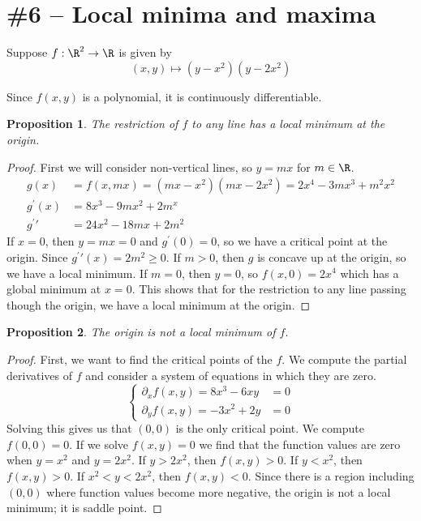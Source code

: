 \documentclass[letterpaper,11pt]{article}
\newtheorem{prop}{Proposition}
\newcommand{\pprime}{\prime\prime}
\begin{document}
\section*{\#6 -- Local minima and maxima}

Suppose $f : \R^2 \to \R$ is given by
\begin{equation*}
    (x, y) \mapsto (y - x^2)(y - 2x^2)
\end{equation*}

Since $f(x, y)$ is a polynomial, it is continuously differentiable.

\begin{prop}
    The restriction of $f$ to any line has a local minimum at the origin.
\end{prop}

\begin{proof}
    First we will consider non-vertical lines, so $y = mx$ for $m \in \R$.
    \begin{align*}
        g(x) &= f(x, mx) = (mx - x^2)(mx - 2x^2) = 2x^4 - 3mx^3 + m^2x^2 \\
        g^\prime(x) &= 8x^3 - 9mx^2 + 2m^x \\
        g^\pprime &= 24x^2 - 18mx + 2m^2
    \end{align*}
    If $x = 0$, then $y = mx = 0$ and $g^\prime(0) = 0$, so we have a critical
    point at the origin. Since $g^\pprime(x) = 2m^2 \geq 0$. If $m > 0$, then
    $g$ is concave up at the origin, so we have a local minimum. If $m=0$, then
    $y = 0$, so $f(x, 0) = 2x^4$ which has a global minimum at $x = 0$.
    This shows that for the restriction to any line passing though the origin,
    we have a local minimum at the origin.
\end{proof}

\begin{prop}
    The origin is not a local minimum of $f$.
\end{prop}

\begin{proof}
    First, we want to find the critical points of the $f$. We compute the
    partial derivatives of $f$ and consider a system of equations in which they
    are zero.
    \begin{equation*}
        \begin{cases}
            \partial_x f(x, y) = 8x^3 - 6xy &= 0 \\
            \partial_y f(x, y) = -3x^2 + 2y &= 0
        \end{cases}
    \end{equation*}
    Solving this gives us that $(0, 0)$ is the only critical point. We compute
    $f(0, 0) = 0$. If we solve $f(x, y) = 0$ we find that the function values
    are zero when $y = x^2$ and $y = 2x^2$. If $y > 2x^2$, then $f(x, y) > 0$.
    If $y < x^2$, then $f(x, y) > 0$. If $x^2 < y < 2x^2$, then $f(x, y) < 0$.
    Since there is a region including $(0, 0)$ where function values become
    more negative, the origin is not a local minimum; it is saddle point.
\end{proof}
\end{document}
